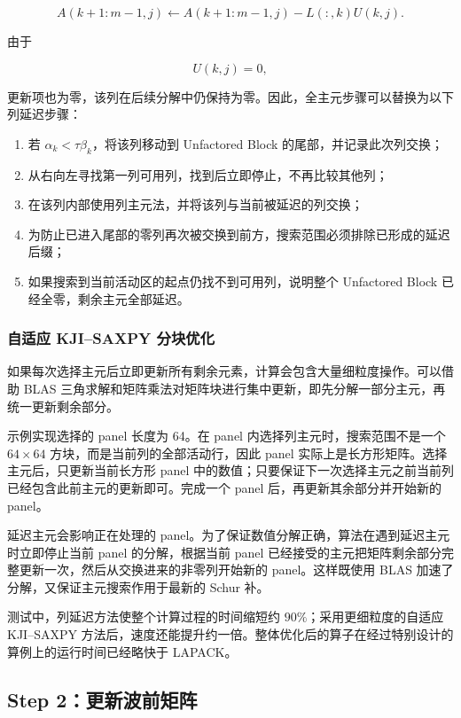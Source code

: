 \[
A(k+1:m-1,j)
\leftarrow
A(k+1:m-1,j)-L(:,k)U(k,j).
\]

由于

\[
U(k,j)=0,
\]

更新项也为零，该列在后续分解中仍保持为零。因此，全主元步骤可以替换为以下列延迟步骤：

\begin{enumerate}
  \item 若 $\alpha_k<\tau\beta_k$，将该列移动到 Unfactored Block 的尾部，并记录此次列交换；
  \item 从右向左寻找第一列可用列，找到后立即停止，不再比较其他列；
  \item 在该列内部使用列主元法，并将该列与当前被延迟的列交换；
  \item 为防止已进入尾部的零列再次被交换到前方，搜索范围必须排除已形成的延迟后缀；
  \item 如果搜索到当前活动区的起点仍找不到可用列，说明整个 Unfactored Block 已经全零，剩余主元全部延迟。
\end{enumerate}

\subsubsection{自适应 KJI--SAXPY 分块优化}

如果每次选择主元后立即更新所有剩余元素，计算会包含大量细粒度操作。可以借助 BLAS 三角求解和矩阵乘法对矩阵块进行集中更新，即先分解一部分主元，再统一更新剩余部分。

示例实现选择的 panel 长度为 64。在 panel 内选择列主元时，搜索范围不是一个 $64\times64$ 方块，而是当前列的全部活动行，因此 panel 实际上是长方形矩阵。选择主元后，只更新当前长方形 panel 中的数值；只要保证下一次选择主元之前当前列已经包含此前主元的更新即可。完成一个 panel 后，再更新其余部分并开始新的 panel。

延迟主元会影响正在处理的 panel。为了保证数值分解正确，算法在遇到延迟主元时立即停止当前 panel 的分解，根据当前 panel 已经接受的主元把矩阵剩余部分完整更新一次，然后从交换进来的非零列开始新的 panel。这样既使用 BLAS 加速了分解，又保证主元搜索作用于最新的 Schur 补。

测试中，列延迟方法使整个计算过程的时间缩短约 $90\%$；采用更细粒度的自适应 KJI--SAXPY 方法后，速度还能提升约一倍。整体优化后的算子在经过特别设计的算例上的运行时间已经略快于 LAPACK。

\subsection{Step 2：更新波前矩阵}

